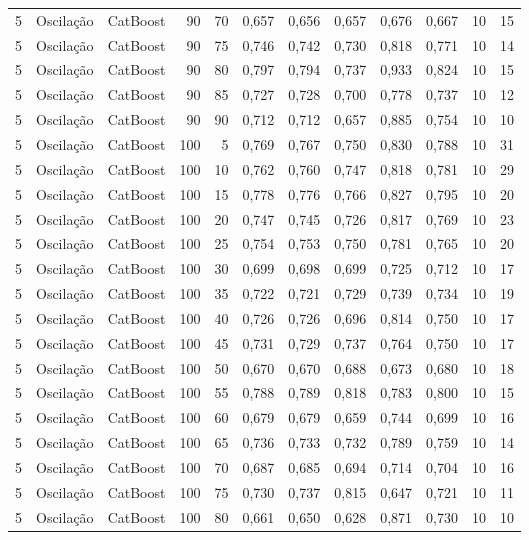 \begin{longtable}{@{}rllrrrrrrrrr@{}}
5 & Oscilação & CatBoost & 90 & 70 & 0,657 & 0,656 & 0,657 & 0,676 & 0,667 & 10 & 15 \\
5 & Oscilação & CatBoost & 90 & 75 & 0,746 & 0,742 & 0,730 & 0,818 & 0,771 & 10 & 14 \\
5 & Oscilação & CatBoost & 90 & 80 & 0,797 & 0,794 & 0,737 & 0,933 & 0,824 & 10 & 15 \\
5 & Oscilação & CatBoost & 90 & 85 & 0,727 & 0,728 & 0,700 & 0,778 & 0,737 & 10 & 12 \\
5 & Oscilação & CatBoost & 90 & 90 & 0,712 & 0,712 & 0,657 & 0,885 & 0,754 & 10 & 10 \\
5 & Oscilação & CatBoost & 100 & 5 & 0,769 & 0,767 & 0,750 & 0,830 & 0,788 & 10 & 31 \\
5 & Oscilação & CatBoost & 100 & 10 & 0,762 & 0,760 & 0,747 & 0,818 & 0,781 & 10 & 29 \\
5 & Oscilação & CatBoost & 100 & 15 & 0,778 & 0,776 & 0,766 & 0,827 & 0,795 & 10 & 20 \\
5 & Oscilação & CatBoost & 100 & 20 & 0,747 & 0,745 & 0,726 & 0,817 & 0,769 & 10 & 23 \\
5 & Oscilação & CatBoost & 100 & 25 & 0,754 & 0,753 & 0,750 & 0,781 & 0,765 & 10 & 20 \\
5 & Oscilação & CatBoost & 100 & 30 & 0,699 & 0,698 & 0,699 & 0,725 & 0,712 & 10 & 17 \\
5 & Oscilação & CatBoost & 100 & 35 & 0,722 & 0,721 & 0,729 & 0,739 & 0,734 & 10 & 19 \\
5 & Oscilação & CatBoost & 100 & 40 & 0,726 & 0,726 & 0,696 & 0,814 & 0,750 & 10 & 17 \\
5 & Oscilação & CatBoost & 100 & 45 & 0,731 & 0,729 & 0,737 & 0,764 & 0,750 & 10 & 17 \\
5 & Oscilação & CatBoost & 100 & 50 & 0,670 & 0,670 & 0,688 & 0,673 & 0,680 & 10 & 18 \\
5 & Oscilação & CatBoost & 100 & 55 & 0,788 & 0,789 & 0,818 & 0,783 & 0,800 & 10 & 15 \\
5 & Oscilação & CatBoost & 100 & 60 & 0,679 & 0,679 & 0,659 & 0,744 & 0,699 & 10 & 16 \\
5 & Oscilação & CatBoost & 100 & 65 & 0,736 & 0,733 & 0,732 & 0,789 & 0,759 & 10 & 14 \\
5 & Oscilação & CatBoost & 100 & 70 & 0,687 & 0,685 & 0,694 & 0,714 & 0,704 & 10 & 16 \\
5 & Oscilação & CatBoost & 100 & 75 & 0,730 & 0,737 & 0,815 & 0,647 & 0,721 & 10 & 11 \\
5 & Oscilação & CatBoost & 100 & 80 & 0,661 & 0,650 & 0,628 & 0,871 & 0,730 & 10 & 10 \\

\end{longtable}
